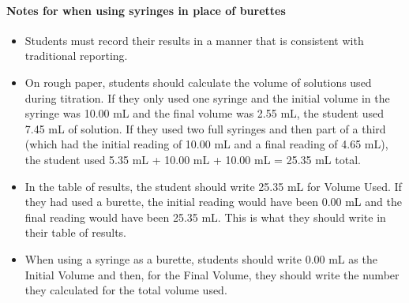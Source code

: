 \paragraph{Notes for when using syringes in place of burettes}
\begin{itemize}
\item Students must record their results in a manner that is consistent with traditional reporting.
\item On rough paper, students should calculate the volume of solutions used during titration. If they only used one syringe and the initial volume in the syringe was 10.00 mL and the final volume was 2.55 mL, the student used 7.45 mL of solution. If they used two full syringes and then part of a third (which had the initial reading of 10.00 mL and a final reading of 4.65 mL), the student used 5.35 mL + 10.00 mL + 10.00 mL = 25.35 mL total.
\item In the table of results, the student should write 25.35 mL for Volume Used. If they had used a burette, the initial reading would have been 0.00 mL and the final reading would have been 25.35 mL. This is what they should write in their table of results.
\item When using a syringe as a burette, students should write 0.00 mL as the Initial Volume and then, for the Final Volume, they should write the number they calculated for the total volume used.
\end{itemize}


